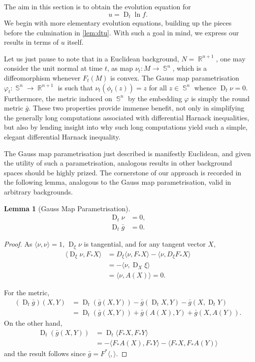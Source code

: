 \documentclass{amsart}
\newtheorem{lemma}[theorem]{Lemma}
\theoremstyle{definition}
\theoremstyle{remark}
\newcommand{\ip}[2]{\ensuremath{\langle{#1},{#2}\rangle}}
\DeclareMathOperator{\D}{D}
\DeclareMathOperator{\RR}{\mathbb{R}}
\DeclareMathOperator{\sphere}{\mathbb{S}}
\numberwithin{equation}{section}
\begin{document}
The aim in this section is to obtain the evolution equation for
\[
u = \D_t \ln f.
\]
We begin with more elementary evolution equations, building up the pieces before the culmination in \cref{lem:dtu}. With such a goal in mind, we express our results in terms of $u$ itself.

Let us just pause to note that in a Euclidean background, $N = \RR^{n+1}$, one may consider the unit normal at time $t$, as map $\nu_t : M \to \sphere^n$, which is a diffeomorphism whenever $F_t(M)$ is convex. The Gauss map parametrisation $\varphi_t: \sphere^n \to \RR^{n+1}$ \cite{MR1296393} is such that $\nu_t(\phi_t(z)) = z$ for all $z \in \sphere^n$ whence $\D_t \nu = 0$. Furthermore, the metric induced on $\sphere^n$ by the embedding $\varphi$ is simply the round metric $\bar{g}$. These two properties provide immense benefit, not only in simplifying the generally long computations associated with differential Harnack inequalities, but also by lending insight into why such long computations yield such a simple, elegant differential Harnack inequality.

The Gauss map parametrisation just described is manifestly Euclidean, and given the utility of such a parametrisation, analogous results in other background spaces should be highly prized. The cornerstone of our approach is recorded in the following lemma, analogous to the Gauss map parametrisation, valid in arbitrary backgrounds.

\begin{lemma}[Gauss Map Parametrisation]
\label{lem:gaussmap}
\begin{align}
\D_t \nu & = 0, \\
\D_t \bar{g} &= 0.
\end{align}
\end{lemma}

\begin{proof}
As $\ip{\nu}{\nu} = 1$, $\D_{\xi} \nu$ is tangential, and for any tangent vector $X$,
\[
\begin{split}
\ip{\D_{\xi} \nu}{F_{\ast} X} &= D_{\xi} \ip{\nu}{F_{\ast}X} - \ip{\nu}{D_{\xi} F_{\ast} X} \\
&= -\ip{\nu}{\D_{X}\xi} \\
&= \ip{\nu}{A(X)} = 0.
\end{split}
\]

For the metric,
\[
\begin{split}
\left(\D_t \bar{g}\right) (X, Y) &= \D_t (\bar{g}(X, Y)) - \bar{g}(\D_t X, Y) - \bar{g}(X, \D_t Y) \\
&= \D_t (\bar{g}(X, Y)) + \bar{g}(A(X), Y) + \bar{g}(X, A(Y)).
\end{split}
\]
On the other hand,
\[
\begin{split}
\D_t (\bar{g}(X, Y)) &= \D_t \ip{F_{\ast} X}{F_{\ast} Y} \\
&= -\ip{F_{\ast} A(X)}{F_{\ast} Y} - \ip{F_{\ast} X}{F_{\ast} A(Y)}
\end{split}
\]
and the result follows since $\bar{g} = F^{\ast} \ip{}{}$.
\end{proof}
\end{document}
